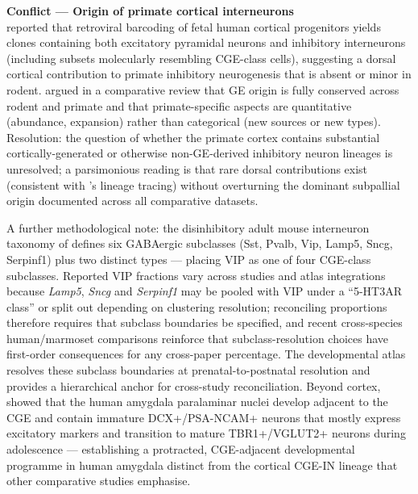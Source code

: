 \documentclass[11pt]{article}
\begin{document}
\begin{framed}
\textbf{Conflict --- Origin of primate cortical interneurons}\\
\citet{Delgado2022} reported that retroviral barcoding of fetal human cortical progenitors yields clones containing both excitatory pyramidal neurons and inhibitory interneurons (including subsets molecularly resembling CGE-class cells), suggesting a dorsal cortical contribution to primate inhibitory neurogenesis that is absent or minor in rodent. \citet{Marin2025} argued in a comparative review that GE origin is fully conserved across rodent and primate and that primate-specific aspects are quantitative (abundance, expansion) rather than categorical (new sources or new types). Resolution: the question of whether the primate cortex contains substantial cortically-generated or otherwise non-GE-derived inhibitory neuron lineages is unresolved; a parsimonious reading is that rare dorsal contributions exist (consistent with \citet{Delgado2022}'s lineage tracing) without overturning the dominant subpallial origin documented across all comparative datasets.
\end{framed}

A further methodological note: the disinhibitory adult mouse interneuron taxonomy of \citet{Tasic2018} defines six GABAergic subclasses (Sst, Pvalb, Vip, Lamp5, Sncg, Serpinf1) plus two distinct types --- placing VIP as one of four CGE-class subclasses. Reported VIP fractions vary across studies and atlas integrations because \textit{Lamp5}, \textit{Sncg} and \textit{Serpinf1} may be pooled with VIP under a ``5-HT3AR class'' or split out depending on clustering resolution; reconciling proportions therefore requires that subclass boundaries be specified, and recent cross-species human/marmoset comparisons \citep{Hodge2019, Krienen2023} reinforce that subclass-resolution choices have first-order consequences for any cross-paper percentage. The \citet{Vanvelthoven2025} developmental atlas resolves these subclass boundaries at prenatal-to-postnatal resolution and provides a hierarchical anchor for cross-study reconciliation. Beyond cortex, \citet{Sorrells2019} showed that the human amygdala paralaminar nuclei develop adjacent to the CGE and contain immature DCX+/PSA-NCAM+ neurons that mostly express excitatory markers and transition to mature TBR1+/VGLUT2+ neurons during adolescence --- establishing a protracted, CGE-adjacent developmental programme in human amygdala distinct from the cortical CGE-IN lineage that other comparative studies emphasise.
\end{document}
